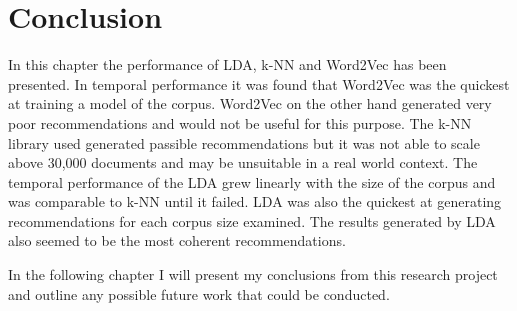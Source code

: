 \section{Conclusion}
In this chapter the performance of LDA, k-NN and Word2Vec has been presented.
In temporal performance it was found that Word2Vec was the quickest at training a model of the corpus.
Word2Vec on the other hand generated very poor recommendations and would not be useful for this purpose.
The k-NN library used generated passible recommendations but it was not able to scale above 30,000 documents and may be unsuitable in a real world context.
The temporal performance of the LDA grew linearly with the size of the corpus and was comparable to k-NN until it failed.
LDA was also the quickest at generating recommendations for each corpus size examined.
The results generated by LDA also seemed to be the most coherent recommendations.

In the following chapter I will present my conclusions from this research project and outline any possible future work that could be conducted.
